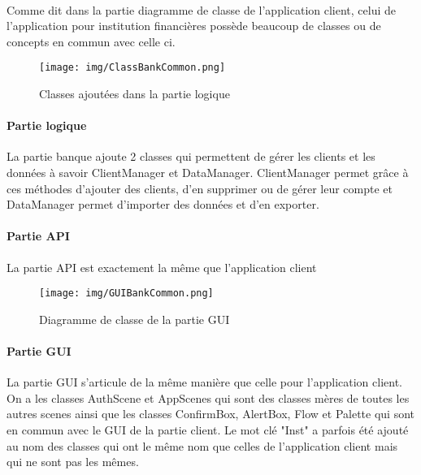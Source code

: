 \paragraph{}Comme dit dans la partie diagramme de classe de l’application client, celui de l’application pour institution financières possède beaucoup de classes ou de concepts en commun avec celle ci.


\begin{figure}[ht]
\centering
\texttt{[image: img/ClassBankCommon.png]}
\caption{Classes ajoutées dans la partie logique}
\label{fig1}
\end{figure}

\paragraph{Partie logique}La partie banque ajoute 2 classes qui permettent de gérer les clients et les données à savoir ClientManager et DataManager. ClientManager permet grâce à ces méthodes d’ajouter des clients, d’en supprimer ou de gérer leur compte et DataManager permet d’importer des données et d’en exporter.

\paragraph{Partie API} La partie API est exactement la même que l'application client

\newpage

\begin{figure}[ht]
\centering
\texttt{[image: img/GUIBankCommon.png]}
\caption{Diagramme de classe de la partie GUI }
\label{fig2}
\end{figure}

\paragraph*{Partie GUI} La partie GUI s’articule de la même manière que celle pour l’application client. On a les classes AuthScene et AppScenes qui sont des classes mères de toutes les autres scenes ainsi que les classes ConfirmBox, AlertBox, Flow et Palette qui sont en commun avec le GUI de la partie client. Le mot clé "Inst" a parfois été ajouté au nom des classes qui ont le même nom que celles de l'application client mais qui ne sont pas les mêmes.
